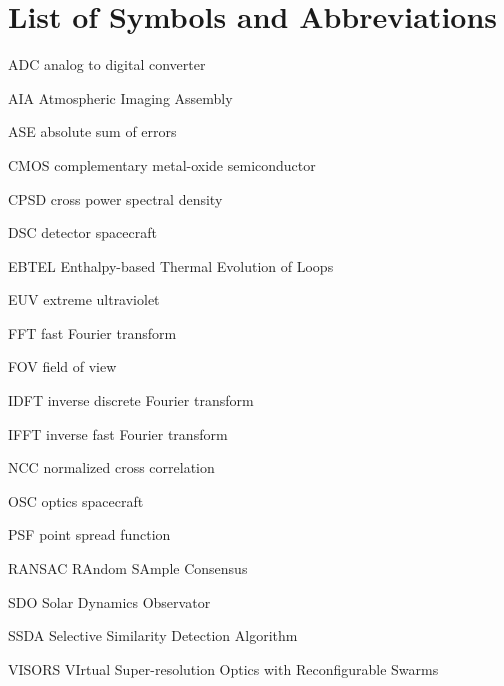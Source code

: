 \documentclass[tocnosub,noragright,centerchapter,12pt]{uiucecethesis09}
\begin{document}
%
\begin{acknowledgments}
\end{acknowledgments}

%
\tableofcontents

%

%

%
\chapter{List of Symbols and Abbreviations}

\begin{symbollist*}
  \item[ADC] analog to digital converter
  \item[AIA] Atmospheric Imaging Assembly
  \item[ASE] absolute sum of errors
  \item[CMOS] complementary metal-oxide semiconductor
  \item[CPSD] cross power spectral density
  \item[DSC] detector spacecraft
  \item[EBTEL] Enthalpy-based Thermal Evolution of Loops
  \item[EUV] extreme ultraviolet
  \item[FFT] fast Fourier transform
  \item[FOV] field of view
  \item[IDFT] inverse discrete Fourier transform
  \item[IFFT] inverse fast Fourier transform
  \item[NCC] normalized cross correlation
  \item[OSC] optics spacecraft
  \item[PSF] point spread function
  \item[RANSAC] RAndom SAmple Consensus
  \item[SDO] Solar Dynamics Observator
  \item[SSDA] Selective Similarity Detection Algorithm
  \item[VISORS] VIrtual Super-resolution Optics with Reconfigurable Swarms
\end{symbollist*}
\end{document}
